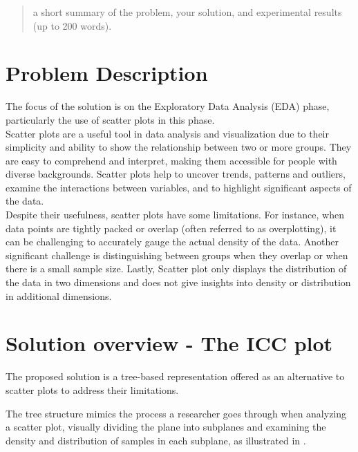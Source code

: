 \documentclass[11pt]{article}
\begin{document}
\maketitle

\begin{abstract}
a short summary of the problem, your solution, and experimental results (up to 200 words).
\end{abstract}

\section{Problem Description}\label{Problem Description}
The focus of the solution is on the Exploratory Data Analysis (EDA) phase, particularly the use of scatter plots in this phase. \\
Scatter plots are a useful tool in data analysis and visualization due to their simplicity and ability to show the relationship between two or more groups. They are easy to comprehend and interpret, making them accessible for people with diverse backgrounds. Scatter plots help to uncover trends, patterns and outliers, examine the interactions between variables, and to highlight significant aspects of the data. \\
Despite their usefulness, scatter plots have some limitations. For instance, when data points are tightly packed or overlap (often referred to as overplotting), it can be challenging to accurately gauge the actual density of the data. Another significant challenge is distinguishing between groups when they overlap or when there is a small sample size. Lastly, Scatter plot only displays the distribution of the data in two dimensions and does not give insights into density or distribution in additional dimensions.

\section{Solution overview - The ICC plot}\label{Solution overview}
The proposed solution is a tree-based representation offered as an alternative to scatter plots to address their limitations.

The tree structure mimics the process a researcher goes through when analyzing a scatter plot, visually dividing the plane into subplanes and examining the density and distribution of samples in each subplane, as illustrated in .
\end{document}

